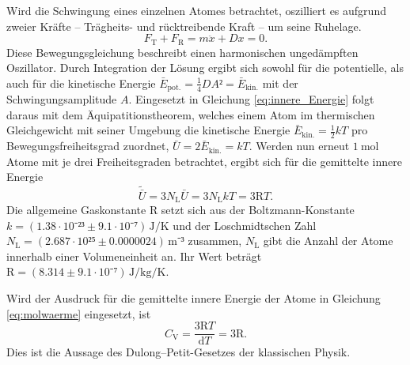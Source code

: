 Wird die Schwingung eines einzelnen Atomes betrachtet, oszilliert es aufgrund zweier Kräfte -- Trägheits- und rücktreibende Kraft -- um seine Ruhelage. 
\begin{equation}
	F_\mathup{T}+F_\mathup{R}=m\ddot{x}+Dx=0.
\end{equation}
Diese Bewegungsgleichung beschreibt einen harmonischen ungedämpften Oszillator. 
Durch Integration der Lösung ergibt sich sowohl für die potentielle, als auch für die kinetische Energie $\bar{E}_\mathup{pot.}=\frac{1}{4}DA²=\bar{E}_\mathup{kin.}$ mit der Schwingungsamplitude $A$.
Eingesetzt in Gleichung \eqref{eq:innere_Energie}
folgt daraus mit dem Äquipatitionstheorem, welches einem Atom im thermischen Gleichgewicht mit seiner Umgebung die kinetische Energie $\bar{E}_\mathup{kin.}=\frac{1}{2}kT$ pro Bewegungsfreiheitsgrad zuordnet, $\bar{U}=2\bar{E}_\mathup{kin.}=kT$. 
Werden nun erneut $\SI{1}{\mol}$ Atome mit je drei Freiheitsgraden betrachtet, ergibt sich für die gemittelte innere Energie 
\begin{equation}
	\tilde{\bar{U}}=3N_\mathup{L}\bar{U}=3N_\mathup{L}kT=3\text{R}T.
\end{equation}
Die allgemeine Gaskonstante $\text{R}$\cite{Gaskonstante} setzt sich aus der Boltzmann-Konstante \\$k=(1.38\cdot{10⁻²³}\pm9.1\cdot{10⁻⁷})\,\si{\joule\per\kelvin}$\cite{Boltzmannkonstante} und 
der Loschmidtschen Zahl \\$N_\mathup{L}=(2.687\cdot 10²⁵\pm0.0000024)\,\si{\meter}⁻³$\cite{Loschmidtzahl} zusammen,
$N_\mathup{L}$ gibt die Anzahl der Atome innerhalb einer Volumeneinheit an. 
Ihr Wert beträgt $\text{R}=(8.314\pm9.1\cdot{10⁻⁷})\,\si{\joule\per\kilo\gram\per\kelvin}$.

Wird der Ausdruck für die gemittelte innere Energie der Atome in Gleichung \eqref{eq:molwaerme} eingesetzt, ist
\begin{equation}
	C_\mathup{V}=\frac{3\text{R}T}{\mathup{d}T}=3\text{R}.
\label{eq:dulong-petit}
\end{equation}
Dies ist die Aussage des Dulong--Petit-Gesetzes der klassischen Physik.\\

